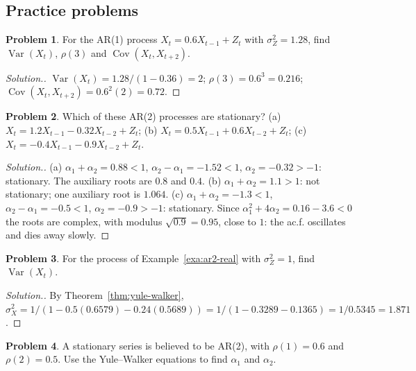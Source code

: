 \documentclass[11pt,a4paper]{article}
\theoremstyle{definition}
\newtheorem{problemx}{Problem}[subsection]
\newenvironment{problem}{\begin{problemx}}{\end{problemx}}
\newenvironment{solution}
  {\renewcommand{\qedsymbol}{}\begin{proof}[\textit{Solution}.]}
  {\end{proof}}
\DeclareMathOperator{\Var}{Var}
\DeclareMathOperator{\Cov}{Cov}
\begin{document}
\subsection{Practice problems}
\begin{problem}\label{prob:ar1-moments}
For the AR(1) process $X_t = 0.6X_{t-1} + Z_t$ with $\sigma_Z^2 = 1.28$, find $\Var(X_t)$, $\rho(3)$ and $\Cov(X_t, X_{t+2})$.
\end{problem}

\begin{solution}
$\Var(X_t) = 1.28/(1 - 0.36) = 2$; $\rho(3) = 0.6^3 = 0.216$; $\Cov(X_t, X_{t+2}) = 0.6^2(2) = 0.72$.
\end{solution}

\begin{problem}\label{prob:ar2-check}
Which of these AR(2) processes are stationary?
(a) $X_t = 1.2X_{t-1} - 0.32X_{t-2} + Z_t$; (b) $X_t = 0.5X_{t-1} + 0.6X_{t-2} + Z_t$; (c) $X_t = -0.4X_{t-1} - 0.9X_{t-2} + Z_t$.
\end{problem}

\begin{solution}
(a) $\alpha_1 + \alpha_2 = 0.88 < 1$, $\alpha_2 - \alpha_1 = -1.52 < 1$, $\alpha_2 = -0.32 > -1$: stationary. The auxiliary roots are $0.8$ and $0.4$.
(b) $\alpha_1 + \alpha_2 = 1.1 > 1$: not stationary; one auxiliary root is $1.064$.
(c) $\alpha_1 + \alpha_2 = -1.3 < 1$, $\alpha_2 - \alpha_1 = -0.5 < 1$, $\alpha_2 = -0.9 > -1$: stationary. Since $\alpha_1^2 + 4\alpha_2 = 0.16 - 3.6 < 0$ the roots are complex, with
modulus $\sqrt{0.9} = 0.95$, close to $1$: the ac.f. oscillates and dies away slowly.
\end{solution}

\begin{problem}\label{prob:ar2-variance}
For the process of Example~\ref{exa:ar2-real} with $\sigma_Z^2 = 1$, find $\Var(X_t)$.
\end{problem}

\begin{solution}
By Theorem~\ref{thm:yule-walker}, $\sigma_X^2 = 1/(1 - 0.5(0.6579) - 0.24(0.5689)) = 1/(1 - 0.3289 - 0.1365) = 1/0.5345 = 1.871$.
\end{solution}

\begin{problem}\label{prob:yw-reverse}
A stationary series is believed to be AR(2), with $\rho(1) = 0.6$ and $\rho(2) = 0.5$. Use the Yule--Walker equations to find $\alpha_1$ and $\alpha_2$.
\end{problem}
\end{document}
